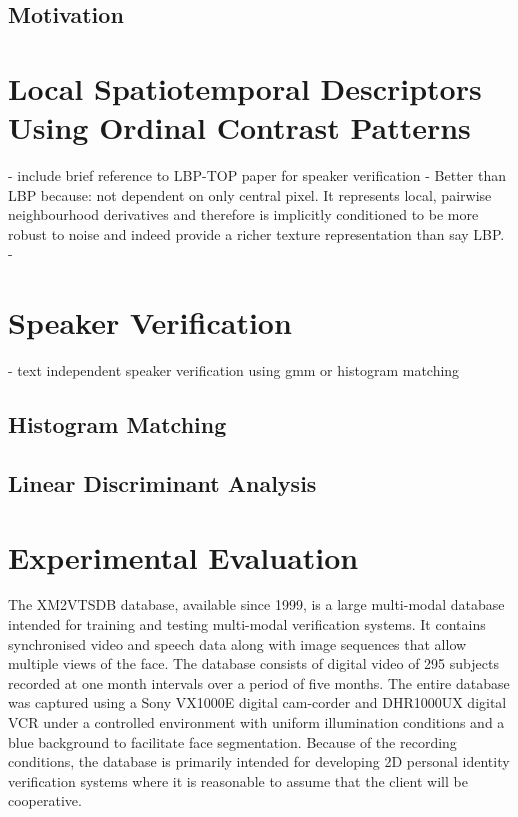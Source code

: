 \documentclass[a4paper, 10pt, conference]{ieeeconf}      %
\begin{document}
\subsection{Motivation}
\label{Motivation}
\section{Local Spatiotemporal Descriptors Using Ordinal Contrast Patterns}
\label{LSDOCP}
- include brief reference to LBP-TOP paper for speaker verification
- Better than LBP because: not dependent on only central pixel. It represents local, pairwise neighbourhood derivatives and therefore is implicitly conditioned to be more robust to noise and indeed provide a richer texture representation than say LBP. 
- 

\section{Speaker Verification}
\label{SVS}
- text independent speaker verification using gmm or histogram matching
\subsection{Histogram Matching}

\subsection{Linear Discriminant Analysis}

\section{Experimental Evaluation}
\label{Evaluation}
The XM2VTSDB \cite{Messer99Xm2vts} database, available since 1999, is a large multi-modal database intended for training and testing multi-modal verification systems. It contains synchronised video and speech data along with image sequences that allow multiple views of the face. The database consists of digital video of 295 subjects recorded at one month intervals over a period of five months. The entire database was captured using a Sony VX1000E digital cam-corder and DHR1000UX digital VCR under a controlled environment with uniform illumination conditions and a blue background to facilitate face segmentation. Because of the recording conditions, the database is primarily intended for developing 2D personal identity verification systems where it is reasonable to assume that the client will be cooperative.
\end{document}
